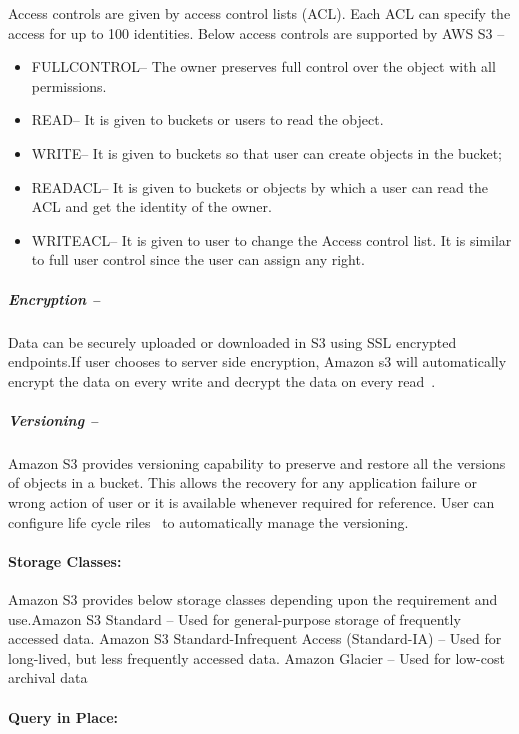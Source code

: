 Access controls are given by access control lists (ACL). Each ACL can specify
the access for up to 100 identities.
Below access controls are supported by AWS S3 – 
\begin{itemize}
\item FULLCONTROL– The owner preserves full control over the object with all
permissions.
\item READ– It is given to buckets or users to read the object. 
\item WRITE– It is given to buckets so that user can create objects in the
bucket;
\item READACL– It is given to buckets or objects by which a user can read the
ACL and get the identity of the owner.
\item WRITEACL– It is given to user to change the Access control list. It is
similar to full
user control since the user can assign any right.
\end{itemize}

\subparagraph{Encryption – }

Data can be securely uploaded or downloaded in S3 using SSL encrypted
endpoints.If user chooses to server side encryption, Amazon s3 will
automatically encrypt
the data on every write and decrypt the data on every
read~\cite{hid-sp18-420-amazon-S3-data-encryption}.

\subparagraph{Versioning – }

Amazon S3 provides versioning capability to preserve and restore all the
versions of objects in a bucket. This allows the recovery for any application
failure or wrong action of user or it is available whenever required for
reference. User can configure life cycle
riles~\cite{hid-sp18-420-amazon-S3-lidecycle-rule} to automatically manage the
versioning.

\paragraph{Storage Classes:}

Amazon S3 provides below storage classes depending upon the requirement and use.Amazon S3 Standard – Used for general-purpose storage of frequently accessed
data.
Amazon S3 Standard-Infrequent Access (Standard-IA) – Used for long-lived, but
less frequently accessed data.
Amazon Glacier – Used for low-cost archival data


\paragraph{Query in Place:} 

